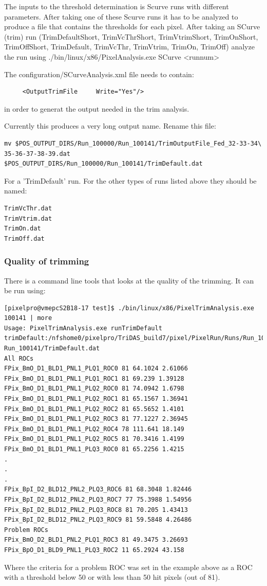 The inputs to the threshold determination is Scurve runs with different parameters. After taking one of these Scurve runs it has to be analyzed to produce a file that contains the  thresholds for each pixel. 
After taking an SCurve (trim) run (TrimDefaultShort, TrimVcThrShort, TrimVtrimShort, TrimOnShort, TrimOffShort, TrimDefault, TrimVcThr, TrimVtrim, TrimOn, TrimOff) analyze the run using ./bin/linux/x86/PixelAnalysis.exe SCurve <runnum> 

The configuration/SCurveAnalysis.xml file needs to contain:
\begin{verbatim}
     <OutputTrimFile     Write="Yes"/>
\end{verbatim}
in order to generat the output needed in the trim analysis.

Currently this produces a very long output name.
Rename this file:
\begin{verbatim}
mv $POS_OUTPUT_DIRS/Run_100000/Run_100141/TrimOutputFile_Fed_32-33-34\
35-36-37-38-39.dat $POS_OUTPUT_DIRS/Run_100000/Run_100141/TrimDefault.dat
\end{verbatim}
For a 'TrimDefault' run.
For the other types of runs listed above they should be named:
\begin{verbatim}
TrimVcThr.dat
TrimVtrim.dat
TrimOn.dat
TrimOff.dat
\end{verbatim}

\subsubsection{Quality of trimming}
\label{sect:checktrims}

There is a command line tools that looks at the quality of the trimming. It can be run using:
\begin{verbatim}
[pixelpro@vmepcS2B18-17 test]$ ./bin/linux/x86/PixelTrimAnalysis.exe 100141 | more
Usage: PixelTrimAnalysis.exe runTrimDefault
trimDefault:/nfshome0/pixelpro/TriDAS_build7/pixel/PixelRun/Runs/Run_100000/\
Run_100141/TrimDefault.dat
All ROCs
FPix_BmO_D1_BLD1_PNL1_PLQ1_ROC0 81 64.1024 2.61066
FPix_BmO_D1_BLD1_PNL1_PLQ1_ROC1 81 69.239 1.39128
FPix_BmO_D1_BLD1_PNL1_PLQ2_ROC0 81 74.0942 1.6798
FPix_BmO_D1_BLD1_PNL1_PLQ2_ROC1 81 65.1567 1.36941
FPix_BmO_D1_BLD1_PNL1_PLQ2_ROC2 81 65.5652 1.4101
FPix_BmO_D1_BLD1_PNL1_PLQ2_ROC3 81 77.1227 2.36945
FPix_BmO_D1_BLD1_PNL1_PLQ2_ROC4 78 111.641 18.149
FPix_BmO_D1_BLD1_PNL1_PLQ2_ROC5 81 70.3416 1.4199
FPix_BmO_D1_BLD1_PNL1_PLQ3_ROC0 81 65.2256 1.4215
.
.
.
FPix_BpI_D2_BLD12_PNL2_PLQ3_ROC6 81 68.3048 1.82446
FPix_BpI_D2_BLD12_PNL2_PLQ3_ROC7 77 75.3988 1.54956
FPix_BpI_D2_BLD12_PNL2_PLQ3_ROC8 81 70.205 1.43413
FPix_BpI_D2_BLD12_PNL2_PLQ3_ROC9 81 59.5848 4.26486
Problem ROCs
FPix_BmO_D2_BLD1_PNL2_PLQ1_ROC3 81 49.3475 3.26693
FPix_BpO_D1_BLD9_PNL1_PLQ3_ROC2 11 65.2924 43.158
\end{verbatim}
Where the criteria for a problem ROC was set in the example above as a ROC with a threshold below 50 or with less than 50 hit pixels (out of 81). 

